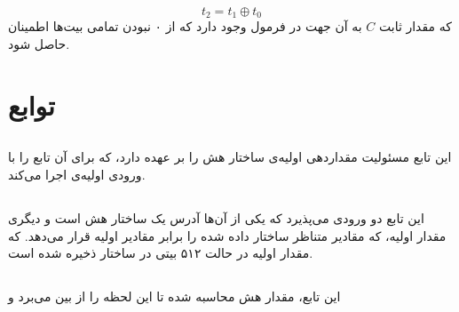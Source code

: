 $$
	t_2 = t_1 \oplus t_0
$$
 که مقدار ثابت $ C $ به آن جهت در فرمول وجود دارد که از ۰ نبودن تمامی بیت‌ها اطمینان حاصل شود.
\section{ توابع}

\subsection{}
\label{subsec:sph-skein512-init}
این تابع مسئولیت مقداردهی اولیه‌ی ساختار هش را بر عهده دارد، که برای آن تابع \hyperref[subsec:skein-big-init]{} را با ورودی‌ اولیه‌ی  اجرا می‌کند.
\subsection{}
\label{subsec:skein-big-init}

این تابع دو ورودی می‌پذیرد که یکی از آن‌ها آدرس یک ساختار هش است و دیگری مقدار اولیه، که مقادیر متناظر ساختار داده شده را برابر مقادیر اولیه قرار می‌دهد.
که مقدار اولیه در حالت ۵۱۲ بیتی در ساختار  ذخیره شده ‌است.

\subsection{}
\label{subsec:sph-skein512}
این تابع، مقدار هش محاسبه شده تا این لحظه را از بین می‌برد و 
